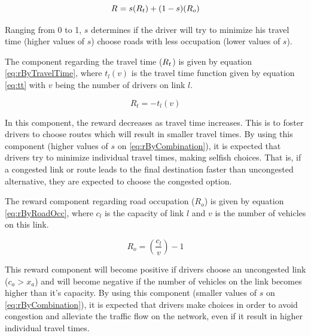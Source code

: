 \documentclass[12pt]{article}
\newcommand{\reward}[1][]{\ensuremath{R_#1}}	%
\begin{document}
\begin{equation}
\label{eq:rByCombination}
\reward{} = s(\reward{t}) + (1 - s)(\reward{o})
\end{equation}

Ranging from 0 to 1, $s$ determines if the driver will try to minimize his travel time (higher values of $s$) choose roads with less occupation (lower values of $s$).

The component regarding the travel time ($\reward{t}$) is given by equation \eqref{eq:rByTravelTime}, where $t_l(v)$ is the travel time function given by equation \eqref{eq:tt} with $v$ being the number of drivers on link $l$.

\begin{equation}
\label{eq:rByTravelTime}
R_t = - t_l(v)
\end{equation}


In this component, the reward decreases as travel time increases. This is to foster drivers to choose routes which will result in smaller travel times. By using this component (higher values of $s$ on \eqref{eq:rByCombination}), it is expected that drivers try to minimize individual travel times, making selfish choices. That is, if a congested link or route leads to the final destination faster than uncongested alternative, they are expected to choose the congested option. 

The reward component regarding road occupation ($R_o$) is given by equation \eqref{eq:rByRoadOcc}, where $c_l$ is the capacity of link $l$ and $v$ is the number of vehicles on this link.

\begin{equation}
\label{eq:rByRoadOcc}
R_o = \left(\frac{c_l}{v}\right) - 1
\end{equation}

This reward component will become positive if drivers choose an uncongested link ($c_a > x_a$) and will become negative if the number of vehicles on the link becomes higher than it's capacity. By using this component (smaller values of $s$ on \eqref{eq:rByCombination}), it is expected that drivers make choices in order to avoid congestion and alleviate the traffic flow on the network, even if it result in higher individual travel times.
\end{document}

